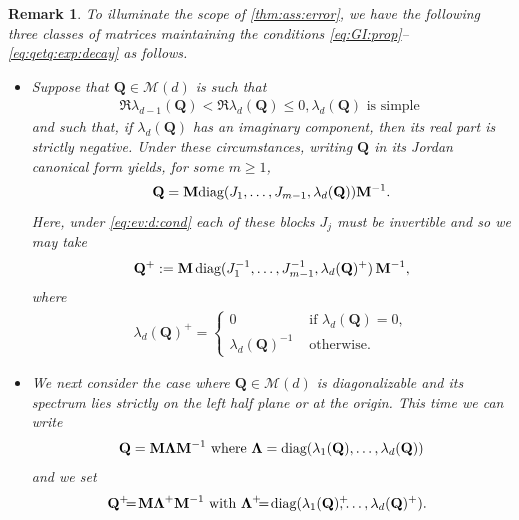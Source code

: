\documentclass[9pt,twocolumn,twoside]{pnas-new}
\newtheorem{Remark}[Theorem]{Remark}
\newcommand{\?}{\textbf{?}}
\newcommand{\diag}{\textnormal{diag}}
\newcommand{\QQ}{\mathbf{Q}}
\newcommand{\LLambda}{\boldsymbol{\Lambda}}
\newcommand{\M}{\mathbf{M}}
\begin{document}
\begin{Remark}\label{rmk:mat:class:dcy}
  To illuminate the scope of \cref{thm:ass:error}, we have the
  following three classes of matrices maintaining the conditions
  \eqref{eq:GI:prop}--\eqref{eq:qetq:exp:decay} as follows.
  \begin{itemize}
  \item[(i)] Suppose that $\QQ \in \mathcal{M}(d)$ is such that
    \begin{align}\label{eq:ev:d:cond}
      \Re \lambda_{d-1}(\QQ) <  \Re \lambda_d({\mathbf Q}) \leq 0,
       \lambda_d({\mathbf Q})  \text{ is simple }
    \end{align}
    and such that, if $\lambda_d({\mathbf Q})$ has an imaginary component,
    then its real part is strictly negative.  Under these
    circumstances, writing $\QQ$ in its Jordan canonical form yields,
    for some $m \geq 1$,
    \begin{equation}\label{e:Q=Jordan_decomp}
      \QQ = \M \diag (J_{1},\hdots,J_{m-1},\lambda_d(\QQ))\M^{-1}.
    \end{equation}
    Here, under \eqref{eq:ev:d:cond} each of
    these blocks $J_j$ must be invertible and so
    we may take
    \begin{align}
      \QQ^+ := \M \,
      \diag (J_{1}^{-1},\hdots,J_{m-1}^{-1},\lambda_d(\QQ)^{+})
      \, \M^{-1},
    \end{align}
    where 
    \begin{align}\label{eq:eig:gen:inv}
      \lambda_d(\QQ)^{+} =
      \begin{cases}
        0& \text{ if } \lambda_d(\QQ) = 0,\\
        \lambda_d(\QQ)^{-1}& \text{ otherwise.}
       \end{cases}
    \end{align}
  \item[(ii)] We next consider the case where $\QQ \in \mathcal{M}(d)$
    is diagonalizable and its spectrum lies strictly on the left half
    plane or at the origin.  This time we can write
    \begin{align}\label{eq:spec:decomp}
    \QQ = \M \LLambda \M^{-1} \text{ where }
      \LLambda = \diag (\lambda_1(\QQ), \ldots ,\lambda_d(\QQ))
    \end{align}
    and we set 
    \begin{align}\label{eq:gen:inv:diag}
     \! \!\! \!\QQ^+ \! \! \!= \!\M \LLambda^+\M^{-1} \text{ with }
      \LLambda^{+} \! \! \!= \! \diag (\lambda_1(\QQ)^+\!\! \! \!, \ldots
      ,\lambda_d(\QQ)^+).

\end{align}
\end{itemize}
\end{Remark}
\end{document}
